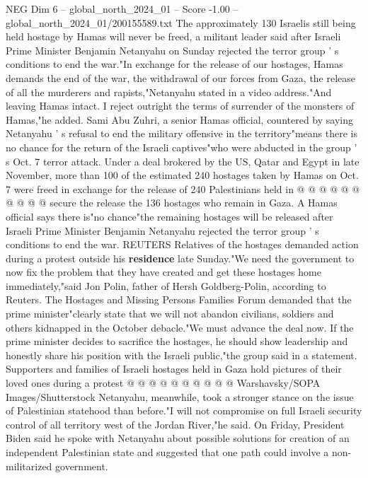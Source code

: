 \begin{textsample}{NEG Dim 6 – global\_north\_2024\_01 – Score -1.00 – global\_north\_2024\_01/200155589.txt}  \label{ex:f6_neg_362}
The approximately 130 Israelis still being held hostage by Hamas will never be freed, a militant leader said after Israeli Prime Minister Benjamin Netanyahu on Sunday rejected the terror group ' s conditions to end the war."In exchange for the release of our hostages, Hamas demands the end of the war, the withdrawal of our forces from Gaza, the release of all the murderers and rapists,"Netanyahu stated in a video address."And leaving Hamas intact.
I reject outright the terms of surrender of the monsters of Hamas,"he added.
Sami Abu Zuhri, a senior Hamas official, countered by saying Netanyahu ' s refusal to end the military offensive in the territory"means there is no chance for the return of the Israeli captives"who were abducted in the group ' s Oct. 7 terror attack.
Under a deal brokered by the US, Qatar and Egypt in late November, more than 100 of the estimated 240 hostages taken by Hamas on Oct. 7 were freed in exchange for the release of 240 Palestinians held in @ @ @ @ @ @ @ @ @ @ secure the release the 136 hostages who remain in Gaza.
A Hamas official says there is"no chance"the remaining hostages will be released after Israeli Prime Minister Benjamin Netanyahu rejected the terror group ' s conditions to end the war.
REUTERS Relatives of the hostages demanded action during a protest outside his \textbf{residence} late Sunday."We need the government to now fix the problem that they have created and get these hostages home immediately,"said Jon Polin, father of Hersh Goldberg-Polin, according to Reuters.
The Hostages and Missing Persons Families Forum demanded that the prime minister"clearly state that we will not abandon civilians, soldiers and others kidnapped in the October debacle."We must advance the deal now.
If the prime minister decides to sacrifice the hostages, he should show leadership and honestly share his position with the Israeli public,"the group said in a statement.
Supporters and families of Israeli hostages held in Gaza hold pictures of their loved ones during a protest @ @ @ @ @ @ @ @ @ @ Warshavsky/SOPA Images/Shutterstock Netanyahu, meanwhile, took a stronger stance on the issue of Palestinian statehood than before."I will not compromise on full Israeli security control of all territory west of the Jordan River,"he said.
On Friday, President Biden said he spoke with Netanyahu about possible solutions for creation of an independent Palestinian state and suggested that one path could involve a non-militarized government.

\end{textsample}
